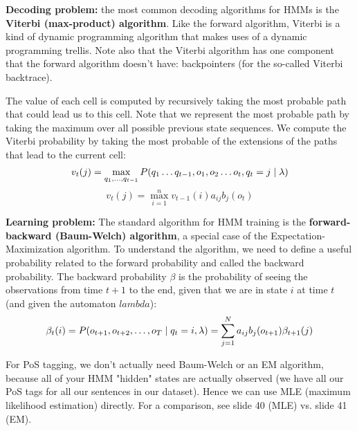 \documentclass[12pt]{article}
\begin{document}
\par \textbf{Decoding problem:} the most common decoding algorithms for HMMs is the \textbf{Viterbi (max-product) algorithm}. Like the forward algorithm, Viterbi is a kind of dynamic programming algorithm that makes uses of a dynamic programming trellis. Note also that the Viterbi algorithm has one component that the forward algorithm doesn't have: backpointers (for the so-called Viterbi backtrace).
\par The value of each cell is computed by recursively taking the most probable path that could lead us to this cell. Note that we represent the most probable path by taking the maximum over all possible previous state sequences. We compute the Viterbi probability by taking the most probable of the extensions of the paths that lead to the current cell:
\[ v_t(j) = \max_{q_1,\dots ,q_{t-1}} P(q_1\dots q_{t-1},o_1,o_2\dots o_t, q_t = j \mid \lambda) \]
\[ v_t(j) = \max_{i=1}^n v_{t-1} (i) a_{ij} b_j (o_t) \]
\par \textbf{Learning problem:} The
standard algorithm for HMM training is the \textbf{forward-backward (Baum-Welch) algorithm}, a special case of the Expectation-Maximization algorithm. To understand the algorithm, we need to define a useful probability related to the forward probability and called the backward probability. The backward probability $\beta$ is the probability of seeing the observations from time $t+1$ to the end, given that we are in state $i$ at time $t$ (and given the automaton $lambda$):
\[ \beta_t(i) = P( o_{t+1},o_{t+2},\dots ,o_T \mid q_t = i , \lambda) = \sum_{j=1}^N a_{ij} b_j(o_{t+1})\beta_{t+1}(j) \]
\par For PoS tagging, we don't actually need Baum-Welch or an EM algorithm, because all of your HMM "hidden" states are actually observed (we have all our PoS tags for all our sentences in our dataset). Hence we can use MLE (maximum likelihood estimation) directly. For a comparison, see slide 40 (MLE) vs. slide 41 (EM).
\end{document}
